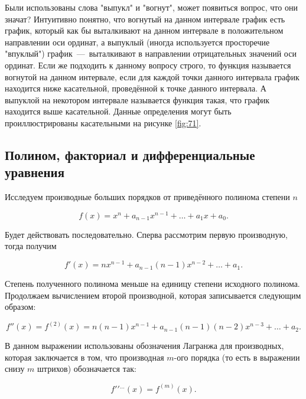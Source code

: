 \documentclass[12pt]{article}
\begin{document}
\par Были использованы слова "выпукл" и "вогнут", может появиться вопрос, что они значат? Интуитивно понятно, что вогнутый на данном интервале график есть график, который как бы выталкивают на данном интервале в положительном направлении оси ординат, а выпуклый (иногда используется просторечие "впуклый") график~\----~выталкивают в направлении отрицательных значений оси ординат. Если же подходить к данному вопросу строго, то функция называется вогнутой на данном интервале, если для каждой точки данного интервала график находится ниже касательной, проведённой к точке данного интервала. А выпуклой на некотором интервале называется функция такая, что график находится выше касательной. Данные определения могут быть проиллюстрированы касательными на рисунке \ref{fig:71}. 

\subsection{Полином, факториал и дифференциальные уравнения}
Исследуем производные больших порядков от приведённого полинома степени $n$

\begin{equation}
	f(x) = x^n + a_{n-1} x^{n-1} + \ldots + a_1 x + a_0.
\end{equation}

Будет действовать последовательно. Сперва рассмотрим первую производную, тогда получим

\begin{equation}
	f'(x) = nx^{n-1} + a_{n-1} (n-1) x^{n-2} + \ldots + a_1.
\end{equation}

Степень полученного полинома меньше на единицу степени исходного полинома. Продолжаем вычислением второй производной, которая записывается следующим образом:

\begin{equation}
	f''(x) = f^{(2)}(x) = n (n-1) x^{n-1} + a_{n-1} (n-1) (n-2) x^{n-3} + \ldots + a_2.
\end{equation}

В данном выражении использованы обозначения Лагранжа для производных, которая заключается в том, что производная $m$\--ого порядка (то есть в выражении снизу $m$ штрихов) обозначается так:

\begin{equation}
	f{}' {}' {}^{\ldots}(x) = f^{(m)}(x).
\end{equation}
\end{document}
